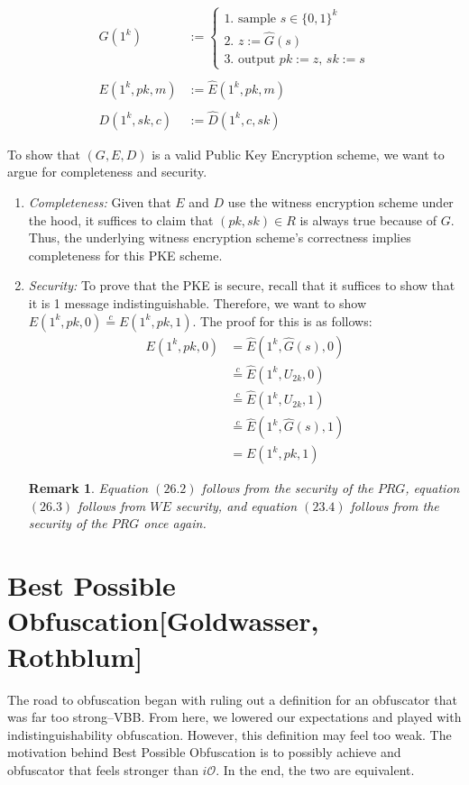 \documentclass{article}
\newtheorem{remark}[corollary]{Remark}
\newcommand{\ci}{\stackrel{c}{=}}
\newcommand{\io}{i\mathcal{O}}
\begin{document}
    \begin{align*}
    G(1^k) &:= \begin{cases}
                    \text{1. sample $s \in\{0,1\}^k$} \\
                    \text{2. $z := \hat{G}(s)$} \\
                    \text{3. output $pk := z$, $sk := s$}
                \end{cases} \\ \\
    E(1^k, pk, m) &:= \hat{E}(1^k, pk, m) \\ \\
    D(1^k, sk, c) &:= \hat{D}(1^k, c, sk)
    \end{align*}


    To show that $(G, E, D)$ is a valid Public Key Encryption scheme, we want to argue for completeness and security.
    \begin{enumerate}
        \item \textit{Completeness:} Given that $E$ and $D$ use the witness encryption scheme under the hood, it suffices to claim that $(pk, sk) \in R$ is always true because of $G$. Thus, the underlying witness encryption scheme's correctness implies completeness for this PKE scheme.

        \item \textit{Security:} To prove that the PKE is secure, recall that it suffices to show that it is 1 message indistinguishable. Therefore, we want to show $E(1^k, pk, 0) \ci E(1^k, pk, 1)$. The proof for this is as follows:
            \begin{align}
                E(1^k, pk, 0) &= \hat{E}(1^k, \hat{G}(s), 0) \\
                &\ci \hat{E}(1^k, U_{2k}, 0) \\
                &\ci \hat{E}(1^k, U_{2k}, 1) \\
                &\ci \hat{E}(1^k, \hat{G}(s), 1) \\
                &= E(1^k, pk, 1)
            \end{align}
        \begin{remark}
        Equation $(26.2)$ follows from the security of the $PRG$, equation $(26.3)$ follows from $WE$ security, and equation $(23.4)$ follows from the security of the $PRG$ once again.
        \end{remark}
    \end{enumerate}

\section{Best Possible Obfuscation[Goldwasser, Rothblum]}
The road to obfuscation began with ruling out a definition for an obfuscator that was far too strong–VBB. From here, we lowered our expectations and played with indistinguishability obfuscation. However, this definition may feel too weak. The motivation behind Best Possible Obfuscation is to possibly achieve and obfuscator that feels stronger than $\io$. In the end, the two are equivalent.
\end{document}
